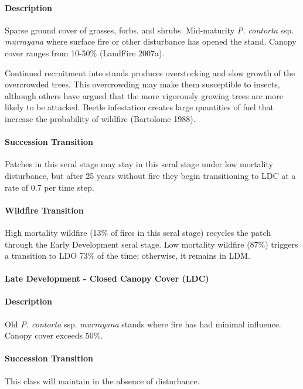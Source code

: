 \paragraph{Description} Sparse ground cover of grasses, forbs, and shrubs. Mid-maturity \emph{P. contorta} ssp. \emph{murrayana} where surface fire or other disturbance has opened the stand. Canopy cover ranges from 10-50\% (LandFire 2007a).

Continued recruitment into stands produces overstocking and slow growth of the overcrowded trees. This overcrowding may make them susceptible to insects, although others have argued that the more vigorously growing trees are more likely to be attacked. Beetle infestation creates large quantities of fuel that increase the probability of wildfire (Bartolome 1988).


\paragraph{Succession Transition} Patches in this seral stage may stay in this seral stage under low mortality disturbance, but after 25 years without fire they begin transitioning to LDC at a rate of 0.7 per time step. 

\paragraph{Wildfire Transition} High mortality wildfire (13\% of fires in this seral stage) recycles the patch through the Early Development seral stage. Low mortality wildfire (87\%) triggers a transition to LDO 73\% of the time; otherwise, it remains in LDM.

\noindent\hrulefill

\paragraph{Late Development - Closed Canopy Cover (LDC)}

\paragraph{Description} Old \emph{P. contorta} ssp. \emph{murrayana} stands where fire has had minimal influence. Canopy cover exceeds 50\%.

\paragraph{Succession Transition} This class will maintain in the absence of disturbance.

